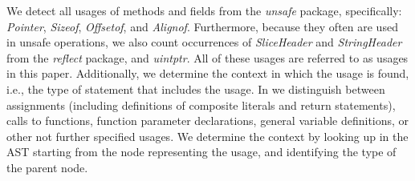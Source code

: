 


We detect all usages of methods and fields from the \textit{unsafe} package, specifically: \textit{Pointer}, \textit{Sizeof}, \textit{Offsetof}, and \textit{Alignof}.
Furthermore, because they often are used in unsafe operations, we also count occurrences of \textit{SliceHeader} and \textit{StringHeader} from the \textit{reflect} package, and \textit{uintptr}.
All of these usages are referred to as \unsafe{} usages in this paper.
Additionally, we determine the context in which the \unsafe{} usage is found, i.e., 
the type of statement that includes the \unsafe{} usage.
In \toolUsage{} we distinguish between assignments (including definitions of composite literals and return statements), calls to functions, function parameter declarations, general variable definitions, or other not further specified usages.
We determine the context by looking up in the AST starting from the node representing the \unsafe{} usage, and identifying the type of the parent node.




